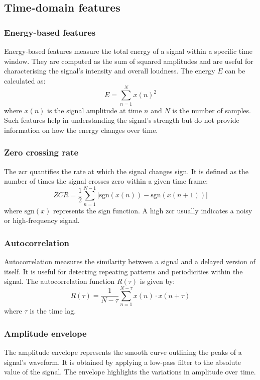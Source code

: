 \subsection{Time-domain features}

\subsubsection{Energy-based features}
Energy-based features measure the total energy of a signal within a specific time window. They are computed as the sum of squared amplitudes and are useful for characterising the signal's intensity and overall loudness. The energy $E$ can be calculated as:
\begin{equation} E = \sum_{n=1}^{N} x(n)^2 \end{equation}
where $ x(n) $ is the signal amplitude at time $ n $ and $ N $ is the number of samples. Such features help in understanding the signal's strength but do not provide information on how the energy changes over time.

\subsubsection{Zero crossing rate}
The \acrfull{zcr} quantifies the rate at which the signal changes sign. It is defined as the number of times the signal crosses zero within a given time frame:
\begin{equation} ZCR = \frac{1}{2} \sum_{n=1}^{N-1} | \text{sgn}(x(n)) - \text{sgn}(x(n+1)) | \end{equation}
where $ \text{sgn}(x) $ represents the sign function. A high \acrlong{zcr} usually indicates a noisy or high-frequency signal.

\subsubsection{Autocorrelation}
Autocorrelation measures the similarity between a signal and a delayed version of itself. It is useful for detecting repeating patterns and periodicities within the signal. The autocorrelation function $ R(\tau) $ is given by:
\begin{equation} R(\tau) = \frac{1}{N-\tau} \sum_{n=1}^{N-\tau} x(n) \cdot x(n+\tau) \end{equation}
where $ \tau $ is the time lag.

\subsubsection{Amplitude envelope}
The amplitude envelope represents the smooth curve outlining the peaks of a signal's waveform. It is obtained by applying a low-pass filter to the absolute value of the signal. The envelope highlights the variations in amplitude over time.

